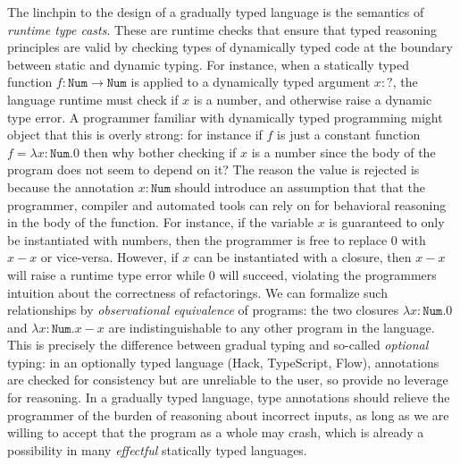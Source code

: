 \documentclass[acmsmall,screen,12pt]{acmart}
\newcommand{\dyn}{{?}}
\begin{document}
The linchpin to the design of a gradually typed language is the
semantics of \emph{runtime type casts}.  These are runtime checks that ensure
that typed reasoning principles are valid by checking types of dynamically typed
code at the boundary between static and dynamic typing.
%
For instance, when a statically typed function $f : \texttt{Num} \to
\texttt{Num}$ is applied to a dynamically typed argument $x : \dyn$,
the language runtime must check if $x$ is a number, and otherwise
raise a dynamic type error.
%
A programmer familiar with dynamically typed programming might object
that this is overly strong: for instance if $f$ is just a constant
function $f = \lambda x:\texttt{Num}. 0$ then why bother checking if
$x$ is a number since the body of the program does not seem to depend
on it?
%
The reason the value is rejected is because the annotation $x :
\texttt{Num}$ should introduce an assumption that that the programmer,
compiler and automated tools can rely on for behavioral reasoning in the
body of the function.  
%
For instance, if the variable $x$ is guaranteed to only be
instantiated with numbers, then the programmer is free to replace $0$
with $x - x$ or vice-versa.
%
However, if $x$ can be instantiated with a closure, then $x - x$ will
raise a runtime type error while $0$ will succeed, violating the
programmers intuition about the correctness of refactorings.
%
We can formalize such relationships by \emph{observational equivalence} of
programs: the two closures $\lambda x:\texttt{Num}. 0$ and $\lambda
x:\texttt{Num}. x - x$ are indistinguishable to any other program in
the language.
%
This is precisely the difference between gradual typing and so-called
\emph{optional} typing: in an optionally typed language (Hack,
TypeScript, Flow), annotations are checked for consistency but are unreliable
to the user, so provide no leverage for reasoning.  
%
In a gradually typed language, type annotations should relieve the
programmer of the 
burden of reasoning about incorrect inputs, as long as we are willing to accept that the program
as a whole may crash, which is already a possibility in many \emph{effectful}
statically typed languages.
%
\end{document}
